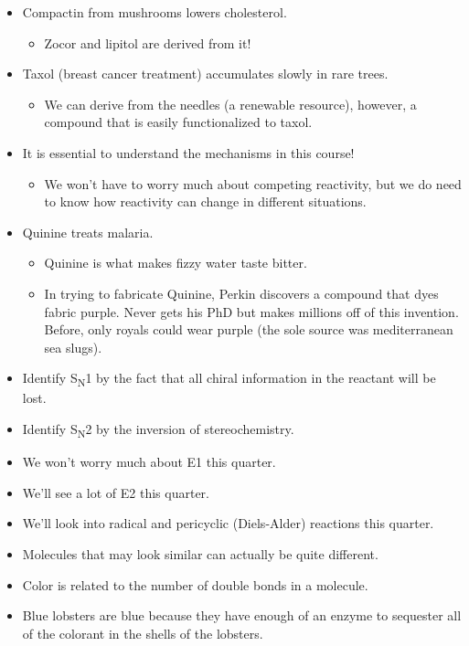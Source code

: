 \documentclass[../notes.tex]{subfiles}
\begin{document}
\begin{itemize}
    \item Compactin from mushrooms lowers cholesterol.
    \begin{itemize}
        \item Zocor and lipitol are derived from it!
    \end{itemize}
    \item Taxol (breast cancer treatment) accumulates slowly in rare trees.
    \begin{itemize}
        \item We can derive from the needles (a renewable resource), however, a compound that is easily functionalized to taxol.
    \end{itemize}
    \item It is essential to understand the mechanisms in this course!
    \begin{itemize}
        \item We won't have to worry much about competing reactivity, but we do need to know how reactivity can change in different situations.
    \end{itemize}
    \item Quinine treats malaria.
    \begin{itemize}
        \item Quinine is what makes fizzy water taste bitter.
        \item In trying to fabricate Quinine, Perkin discovers a compound that dyes fabric purple. Never gets his PhD but makes millions off of this invention. Before, only royals could wear purple (the sole source was mediterranean sea slugs).
    \end{itemize}
    \item Identify S\textsubscript{N}1 by the fact that all chiral information in the reactant will be lost.
    \item Identify S\textsubscript{N}2 by the inversion of stereochemistry.
    \item We won't worry much about E1 this quarter.
    \item We'll see a lot of E2 this quarter.
    \item We'll look into radical and pericyclic (Diels-Alder) reactions this quarter.
    \item Molecules that may look similar can actually be quite different.
    \item Color is related to the number of double bonds in a molecule.
    \item Blue lobsters are blue because they have enough of an enzyme to sequester all of the colorant in the shells of the lobsters.

\end{itemize}
\end{document}
